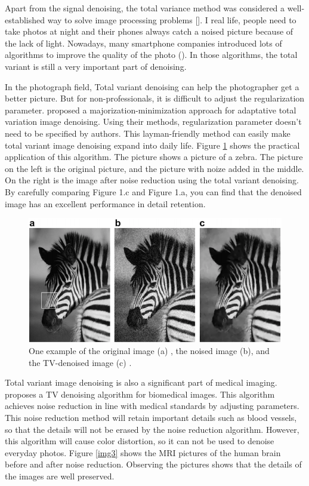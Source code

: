 \documentclass{article}
\begin{document}
Apart from the signal denoising, the total variance method was considered a well-established way to solve image processing problems [\citealp{Chen2010,Blomgren1997,Chen2015,Thanh2015}]. I real life, people need to take photos at night and their phones always catch a noised picture because of the lack of light. Nowadays, many smartphone companies introduced lots of algorithms to improve the quality of the photo (\citealp{Chen2010,Blomgren1997,Chen2015}). In those algorithms, the total variant is still a very important part of denoising.

In the photograph field, Total variant denoising can help the photographer get a better picture. But for non-professionals, it is difficult to adjust the regularization parameter. \citet{Chen2010} proposed a majorization-minimization approach for adaptative total variation image denoising. Using their methods, regularization parameter doesn't need to be specified by authors. This layman-friendly method can easily make total variant image denoising expand into daily life. Figure \ref {img2} shows the practical application of this algorithm. The picture shows a picture of a zebra. The picture on the left is the original picture, and the picture with noize added in the middle. On the right is the image after noise reduction using the total variant denoising. By carefully comparing Figure 1.c and Figure 1.a, you can find that the denoised image has an excellent performance in detail retention.

\begin{figure}[h]
  \includegraphics[width=5in]{pic2.png}
  \centering
  \caption{One example of the original image (a) , the noised image (b), and the TV-denoised image (c) \citep{Chen2010}.}
  \label{img2}
\end{figure}

Total variant image denoising is also a significant part of medical imaging. \citet{Thanh2015} proposes a TV denoising algorithm for biomedical images. This algorithm achieves noise reduction in line with medical standards by adjusting parameters. This noise reduction method will retain important details such as blood vessels, so that the details will not be erased by the noise reduction algorithm. However, this algorithm will cause color distortion, so it can not be used to denoise everyday photos. Figure \ref {img3} shows the MRI pictures of the human brain before and after noise reduction. Observing the pictures shows that the details of the images are well preserved.
\end{document}
